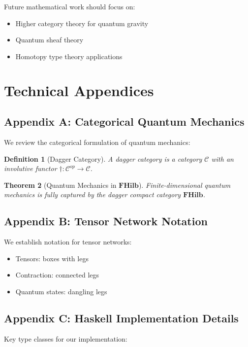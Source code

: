 \documentclass[11pt,a4paper]{article}
\newtheorem{theorem}{Theorem}[section]
\newtheorem{definition}[theorem]{Definition}
\newcommand{\Cat}[1]{\mathbf{#1}}
\begin{document}
Future mathematical work should focus on:
\begin{itemize}
\item Higher category theory for quantum gravity
\item Quantum sheaf theory
\item Homotopy type theory applications
\end{itemize}

\section{Technical Appendices}

\subsection{Appendix A: Categorical Quantum Mechanics}

We review the categorical formulation of quantum mechanics:

\begin{definition}[Dagger Category]
A dagger category is a category $\mathcal{C}$ with an involutive functor $\dagger: \mathcal{C}^{op} \to \mathcal{C}$.
\end{definition}

\begin{theorem}[Quantum Mechanics in $\Cat{FHilb}$]
Finite-dimensional quantum mechanics is fully captured by the dagger compact category $\Cat{FHilb}$.
\end{theorem}

\subsection{Appendix B: Tensor Network Notation}

We establish notation for tensor networks:

\begin{itemize}
\item Tensors: boxes with legs
\item Contraction: connected legs
\item Quantum states: dangling legs
\end{itemize}

\subsection{Appendix C: Haskell Implementation Details}

Key type classes for our implementation:
\end{document}
